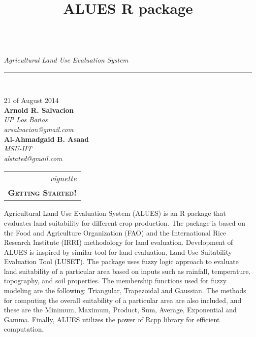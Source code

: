 \documentclass[11pt,fleqn]{article}\usepackage[]{graphicx}\usepackage[]{color}
\title{ALUES R package}
\newcommand{\ddate}{21 of August 2014}
\newcommand{\thepaper}{vignette}
\newcommand{\thesubject}{\textsc{Getting Started!}}
\begin{document}
\noindent
{\\
\textit{Agricultural Land Use Evaluation System}}\\[-0.3cm]
\rule{\linewidth}{0.3mm}\\[0.35cm]
\begin{minipage}[r]{0.5\textwidth}
\bigskip\tableofcontents
\end{minipage}
\begin{minipage}{0.5\textwidth}    
\begin{flushright}
\ddate\\[0.5cm]
\textbf{Arnold R. Salvacion}\\
\textit{UP Los Ba\~{n}os}\\
\textit{arsalvacion@gmail.com}\\[0.5cm]
\textbf{Al-Ahmadgaid B. Asaad}\\
\textit{MSU-IIT}\\
\textit{alstated@gmail.com}\\[0.5cm]
\begin{tabular}{r|}
\textit{\thepaper}\\
\textbf{\thesubject}
\end{tabular}
\end{flushright}
\end{minipage}
\thispagestyle{empty}

\bigskip\bigskip
Agricultural Land Use Evaluation System (ALUES) is an R package that evaluates land suitability for
different crop production. The package is based on the Food and Agriculture Organization (FAO) and the
International Rice Research Institute (IRRI) methodology for land evaluation. Development of ALUES is
inspired by similar tool for land evaluation, Land Use Suitability Evaluation Tool (LUSET). The package
uses fuzzy logic approach to evaluate land suitability of a particular area based on inputs such as rainfall,
temperature, topography, and soil properties. The membership functions used for fuzzy modeling are the
following: Triangular, Trapezoidal and Gaussian. The methods for computing the overall suitability of a particular area are also included, and these are the Minimum, Maximum, Product, Sum, Average, Exponential and Gamma. Finally, ALUES utilizes the power of Rcpp library for efficient computation.
\end{document}

